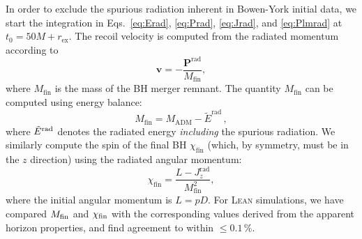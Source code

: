 \documentclass[floats,floatfix,showpacs,amssymb,physrev,twocolumn,superscriptaddress,reprint,
nofootinbib, longbibliography]{revtex4-2}
\newcommand{\rad}{\mathrm{rad}}
\begin{document}
In order to exclude the spurious radiation inherent in Bowen-York initial 
data, we start the integration in Eqs.~\eqref{eq:Erad}, \eqref{eq:Prad}, 
\eqref{eq:Jrad}, and \eqref{eq:Plmrad} at $t_0 = 50M + r_{\mathrm{ex}}$. The 
recoil velocity is computed from the radiated momentum according to 
%
\begin{equation}
    \mathbf{v}=-\frac{\mathbf{P}^{\rad}}{M_{\mathrm{fin}}},
\end{equation}
%
where $M_{\mathrm{fin}}$ is the mass of the BH merger remnant. The 
quantity $M_{\mathrm{fin}}$ can be computed using energy balance:
\begin{equation}
    M_{\mathrm{fin}} = M_{\mathrm{ADM}} - \tilde{E}^{\rad}\,,
\end{equation}
where $\tilde{E}^{\rm rad}$ denotes the radiated energy
{\it including} the spurious radiation.
We similarly compute the spin of the final BH $\chi_{\mathrm{fin}}$ (which,
by symmetry, must be in the $z$ direction) using the radiated angular 
momentum:
\begin{equation}
    \chi_{\mathrm{fin}} = \frac{L-J^{\rad}_z}{M_{\mathrm{fin}}^2},
\end{equation}
where the initial angular momentum is $L=pD$. For \textsc{Lean} simulations, 
we have compared $M_{\rm fin}$ and $\chi_{\rm fin}$ with the
corresponding values derived from the apparent horizon properties,
and find agreement to within $\leq 0.1\,\%$.


\end{document}
